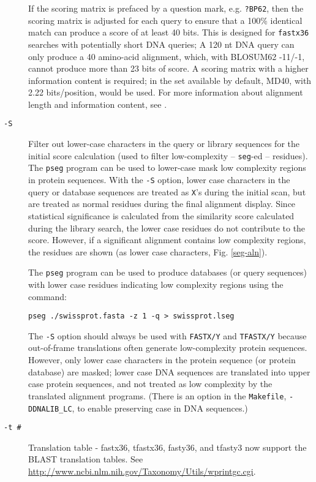 \documentclass[11pt]{article}
\begin{document}
\begin{description}
If the scoring matrix is prefaced by a question mark,
e.g. \texttt{?BP62}, then the scoring matrix is adjusted for each
query to ensure that a 100\% identical match can produce a score of at
least 40 bits.  This is designed for \texttt{fastx36} searches with
potentially short DNA queries; A 120 nt DNA query can only produce a
40 amino-acid alignment, which, with BLOSUM62 -11/-1, cannot produce
more than 23 bits of score. A scoring matrix with a higher information
content is required; in the set available by default, MD40, with 2.22
bits/position, would be used.  For more information about alignment
length and information content, see \cite{alt915}.

\item[\texttt{-S}] Filter out lower-case characters in the query or
  library sequences for the initial score calculation (used to filter
  low-complexity -- \texttt{seg}-ed -- residues).  The \texttt{pseg}
  program \cite{woo935} can be used to lower-case mask low complexity
  regions in protein sequences. With the \texttt{-S} option, lower
  case characters in the query or database sequences are treated as
  \texttt{X}'s during the initial scan, but are treated as normal
  residues during the final alignment display.  Since statistical
  significance is calculated from the similarity score calculated
  during the library search, the lower case residues do not contribute
  to the score.  However, if a significant alignment contains low
  complexity regions, the residues are shown (as lower
  case characters, Fig. \ref{seg-aln}).

The \texttt{pseg} program can be used to produce databases (or query
sequences) with lower case residues indicating low complexity regions
using the command:
\begin{verbatim}
pseg ./swissprot.fasta -z 1 -q > swissprot.lseg
\end{verbatim}

The \texttt{-S} option should always be used with \texttt{FASTX/Y} and
\texttt{TFASTX/Y} because out-of-frame translations often generate
low-complexity protein sequences.  However, only lower case characters
in the protein sequence (or protein database) are masked; lower case
DNA sequences are translated into upper case protein sequences, and
not treated as low complexity by the translated alignment
programs. (There is an option in the \texttt{Makefile},
\texttt{-DDNALIB\_LC}, to enable preserving case in DNA sequences.)

\item[\texttt{-t \#}] Translation table - fastx36, tfastx36, fasty36,
  and tfasty3 now support the BLAST translation tables.  See
  \url{http://www.ncbi.nlm.nih.gov/Taxonomy/Utils/wprintgc.cgi}.  


\end{description}
\end{document}
